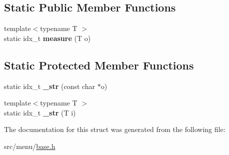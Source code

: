 \subsection*{Static Public Member Functions}
\begin{DoxyCompactItemize}
\item 
\mbox{\label{structTextMeasure_a3c26e32001fe648ace25f4c6e1452e4a}} 
{\footnotesize template$<$typename T $>$ }\\static idx\+\_\+t {\bfseries measure} (T o)
\end{DoxyCompactItemize}
\subsection*{Static Protected Member Functions}
\begin{DoxyCompactItemize}
\item 
\mbox{\label{structTextMeasure_a466072fc74d668a8119f6852ebd64edd}} 
static idx\+\_\+t {\bfseries \+\_\+str} (const char $\ast$o)
\item 
\mbox{\label{structTextMeasure_a02f8835b17f3f3fc3c190b5d3c174cf7}} 
{\footnotesize template$<$typename T $>$ }\\static idx\+\_\+t {\bfseries \+\_\+str} (T i)
\end{DoxyCompactItemize}


The documentation for this struct was generated from the following file\+:\begin{DoxyCompactItemize}
\item 
src/menu/\hyperlink{base_8h}{base.\+h}\end{DoxyCompactItemize}
